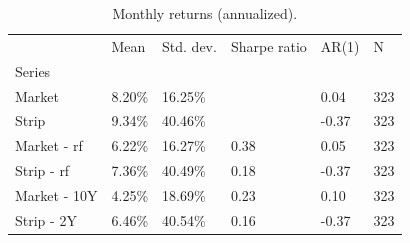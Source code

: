 \begin{table}
\caption{Monthly returns (annualized).}
\label{tab:table1}
\begin{tabular}{llllll}
\toprule
 & Mean & Std. dev. & Sharpe ratio & AR(1) & N \\
Series &  &  &  &  &  \\
\midrule
Market & 8.20\% & 16.25\% &  & 0.04 & 323 \\
Strip & 9.34\% & 40.46\% &  & -0.37 & 323 \\
Market - rf & 6.22\% & 16.27\% & 0.38 & 0.05 & 323 \\
Strip - rf & 7.36\% & 40.49\% & 0.18 & -0.37 & 323 \\
Market - 10Y & 4.25\% & 18.69\% & 0.23 & 0.10 & 323 \\
Strip - 2Y & 6.46\% & 40.54\% & 0.16 & -0.37 & 323 \\
\bottomrule
\end{tabular}
\end{table}
